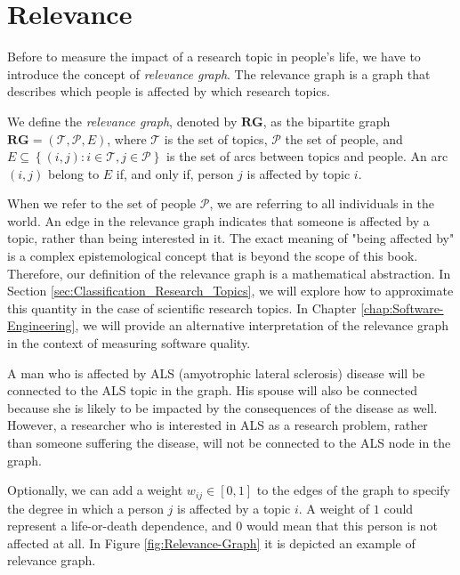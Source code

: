 %
%

\section{Relevance}

Before to measure the impact of a research topic in people's life, we have to introduce the concept of \emph{relevance graph}. The relevance graph is a graph that describes which people is affected by which research topics.

\begin{definition}
\label{def:relevance-graph}
We define the \emph{relevance graph}, denoted by $\mathbf{RG}$, as the bipartite graph $\mathbf{RG} = (\mathcal{T}, \mathcal{P}, E)$, where $\mathcal{T}$ is the set of topics, $\mathcal{P}$ the set of people, and $E\subseteq\left\{ \left(i,j\right):i\in \mathcal{T},j\in \mathcal{P} \right\}$ is the set of arcs between topics and people. An arc $(i, j)$ belong to $E$ if, and only if, person $j$ is affected by topic $i$.
\end{definition}

When we refer to the set of people $\mathcal{P}$, we are referring to all individuals in the world. An edge in the relevance graph indicates that someone is affected by a topic, rather than being interested in it. The exact meaning of "being affected by" is a complex epistemological concept that is beyond the scope of this book. Therefore, our definition of the relevance graph is a mathematical abstraction. In Section \ref{sec:Classification_Research_Topics}, we will explore how to approximate this quantity in the case of scientific research topics. In Chapter \ref{chap:Software-Engineering}, we will provide an alternative interpretation of the relevance graph in the context of measuring software quality.

\begin{example}
A man who is affected by ALS (amyotrophic lateral sclerosis) disease will be connected to the ALS topic in the graph. His spouse will also be connected because she is likely to be impacted by the consequences of the disease as well. However, a researcher who is interested in ALS as a research problem, rather than someone suffering the disease, will not be connected to the ALS node in the graph.
\end{example}

Optionally, we can add a weight $w_{ij}\in\left[0,1\right]$ to the edges of the graph to specify the degree in which a person $j$ is affected by a topic $i$. A weight of $1$ could represent a life-or-death dependence, and $0$ would mean that this person is not affected at all. In Figure \ref{fig:Relevance-Graph} it is depicted an example of relevance graph. 

